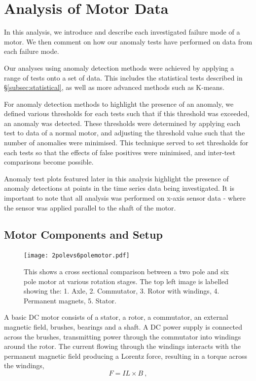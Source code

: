 \section{Analysis of Motor Data}
\label{sec:analysis}

In this analysis, we introduce and describe each investigated failure mode of a motor. We then comment on how our anomaly tests have performed on data from each failure mode.

Our analyses using anomaly detection methods were achieved by applying a range of tests onto a set of data. This includes the statistical tests described in \S\ref{subsec:statistical}, as well as more advanced methods such as K-means.

For anomaly detection methods to highlight the presence of an anomaly, we defined various thresholds for each tests such that if this threshold was exceeded, an anomaly was detected. These thresholds were determined by applying each test to data of a normal motor, and adjusting the threshold value such that the number of anomalies were minimised. This technique served to set thresholds for each tests so that the effects of false positives were minimised, and inter-test comparisons become possible.

Anomaly test plots featured later in this analysis highlight the presence of anomaly detections at points in the time series data being investigated. It is important to note that all analysis was performed on x-axis sensor data - where the sensor was applied parallel to the shaft of the motor.

\subsection{Motor Components and Setup}

\begin{figure}[t]
    \centering
    \texttt{[image: 2polevs6polemotor.pdf]}
    \caption[DC motor cross sectional comparison]{This shows a cross sectional comparison between a two pole and six pole motor at various rotation stages. The top left image is labelled showing the: 1. Axle, 2. Commutator, 3. Rotor with windings, 4. Permanent magnets, 5. Stator.}
    \label{fig:2pole_vs_6pole}
\end{figure}

A basic DC motor consists of a stator, a rotor, a commutator, an external magnetic field, brushes, bearings and a shaft. A DC power supply is connected across the brushes, transmitting power through the commutator into windings around the rotor. The current flowing through the windings interacts with the permanent magnetic field producing a Lorentz force, resulting in a torque across the windings,
\begin{equation}
    F = I L \times B~,
    \label{Lorentz}
\end{equation}

